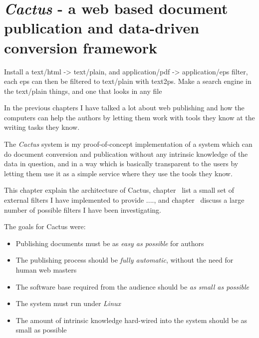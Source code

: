 



\chapter{\textit{Cactus} - a web based document publication and data-driven
  conversion framework}



\textsf{Install a text/html -> text/plain, and application/pdf ->
  application/eps filter, each eps can then be filtered to text/plain
  with text2ps.  Make a search engine in the text/plain things, and
  one that looks in any file}



In the previous chapters I have talked a lot about web
publishing and how the computers can help the authors by
letting them work with tools they know at the writing tasks
they know.

The \textit{Cactus} system is my proof-of-concept
implementation of a system which can do document conversion
and publication without any intrinsic knowledge of the data
in question, and in a way which is basically transparent to
the users by letting them use it as a simple service where
they use the tools they know.

This chapter explain the architecture of Cactus,
chapter~ list a small
set of external filters I have implemented to provide
\textsf{....}, and
chapter~
discuss a large number of possible filters I have been
investigating.

The goals for Cactus were:

\begin{itemize}
\item Publishing documents must be as \textit{easy as
    possible} for authors
  
\item The publishing process should be \textit{fully
    automatic}, without the need for human web masters
  
\item The software base required from the audience should be
  \textit{as small as possible}
  
\item The system must run under \textit{Linux}
  
\item The amount of intrinsic knowledge hard-wired into the
  system should be as small as possible

\end{itemize}


